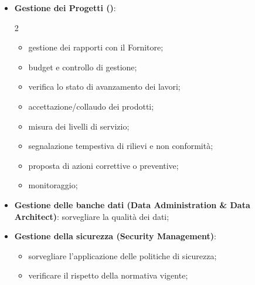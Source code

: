 \begin{note}[Responsabilità]
    \begin{itemize}
        \item \textbf{Gestione dei Progetti ()}:
            \begin{multicols}{2}
                \begin{itemize}
                    \item gestione dei rapporti con il Fornitore;
                    \item budget e controllo di gestione;
                    \item verifica lo stato di avanzamento dei lavori;
                    \item accettazione/collaudo dei prodotti;
                    \item misura dei livelli di servizio;
                    \item segnalazione tempestiva di rilievi e non conformità;
                    \item proposta di azioni correttive o preventive;
                    \item monitoraggio;
                \end{itemize}
            \end{multicols}
        \item \textbf{Gestione delle banche dati (Data Administration \& Data Architect)}: sorvegliare la qualità dei dati;
        \item \textbf{Gestione della sicurezza (Security Management)}:
            \begin{itemize}
                \item sorvegliare l'applicazione delle politiche di sicurezza;
                \item verificare il rispetto della normativa vigente;
            \end{itemize}
    \end{itemize}
\end{note}
%
